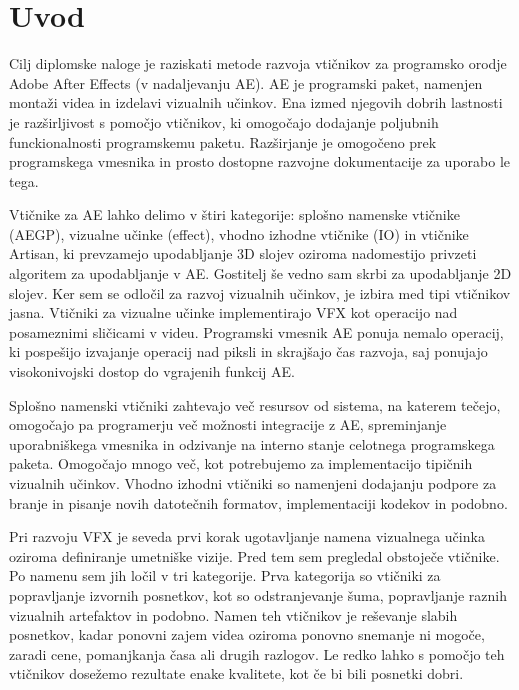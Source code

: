 \documentclass[a4paper, 12pt]{book}
\begin{document}
\mainmatter
\setcounter{page}{1}
\pagestyle{fancy}

\chapter{Uvod}

Cilj diplomske naloge je raziskati metode razvoja vtičnikov za programsko orodje Adobe After Effects (v nadaljevanju AE). 
AE je programski paket, namenjen montaži videa in izdelavi vizualnih učinkov. 
Ena izmed njegovih dobrih lastnosti je razširljivost s pomočjo vtičnikov, ki omogočajo dodajanje poljubnih funckionalnosti programskemu paketu. 
Razširjanje je omogočeno prek programskega vmesnika in prosto dostopne razvojne dokumentacije za uporabo le tega. 

Vtičnike za AE lahko delimo v štiri kategorije: 
splošno namenske vtičnike (AEGP), 
vizualne učinke (effect), 
vhodno izhodne vtičnike (IO) in 
vtičnike Artisan, ki prevzamejo upodabljanje 3D slojev oziroma nadomestijo privzeti algoritem za upodabljanje v AE. 
Gostitelj še vedno sam skrbi za upodabljanje 2D slojev. 
Ker sem se odločil za razvoj vizualnih učinkov, je izbira med tipi vtičnikov jasna. 
Vtičniki za vizualne učinke implementirajo VFX kot operacijo nad posameznimi sličicami v videu. 
Programski vmesnik AE ponuja nemalo operacij, ki pospešijo izvajanje operacij nad piksli in skrajšajo čas razvoja, saj ponujajo visokonivojski dostop do vgrajenih funkcij AE. 

Splošno namenski vtičniki zahtevajo več resursov od sistema, na katerem tečejo, omogočajo pa programerju več možnosti integracije z AE, spreminjanje uporabniškega vmesnika in odzivanje na interno stanje celotnega programskega paketa. 
Omogočajo mnogo več, kot potrebujemo za implementacijo tipičnih vizualnih učinkov. 
Vhodno izhodni vtičniki so namenjeni dodajanju podpore za branje in pisanje novih datotečnih formatov, implementaciji kodekov in podobno.

Pri razvoju VFX je seveda prvi korak ugotavljanje namena vizualnega učinka oziroma definiranje umetniške vizije. 
Pred tem sem pregledal obstoječe vtičnike. 
Po namenu sem jih ločil v tri kategorije. 
Prva kategorija so vtičniki za popravljanje izvornih posnetkov, kot so odstranjevanje šuma, popravljanje raznih vizualnih artefaktov in podobno. 
Namen teh vtičnikov je reševanje slabih posnetkov, kadar ponovni zajem videa oziroma ponovno snemanje ni mogoče, zaradi cene, pomanjkanja časa ali drugih razlogov. 
Le redko lahko s pomočjo teh vtičnikov dosežemo rezultate enake kvalitete, kot če bi bili posnetki dobri. 
\end{document}
